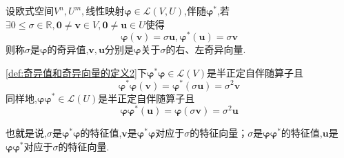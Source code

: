 \begin{formal}
    \begin{definition}[奇异值和奇异向量的定义]\label{def:奇异值和奇异向量的定义2}
        设欧式空间$V^n,U^m,$线性映射$\bm{\varphi}\in\mathcal{L}\left(V,U\right)$,伴随$\bm{\varphi}^*$,若$\exists0\leqslant\sigma\in\mathbb{R},\bm{0}\neq\bm{v}\in V,\bm{0}\neq\bm{u}\in U$使得\[
        \bm{\varphi}\left(\bm{v}\right)=\sigma\bm{u},\bm{\varphi}^*\left(\bm{u}\right)=\sigma\bm{v}
        \]则称$\sigma$是$\bm{\varphi}$的奇异值,$\bm{v},\bm{u}$分别是$\bm{\varphi}$关于$\sigma$的右、左奇异向量.
    \end{definition}
\end{formal}

\begin{red}
    \begin{remark}
        \cref{def:奇异值和奇异向量的定义2}下$\bm{\varphi}^*\bm{\varphi}\in\mathcal{L}\left(V\right)$是半正定自伴随算子且\[
        \bm{\varphi}^*\bm{\varphi}\left(\bm{v}\right)=\bm{\varphi}^*\left(
            \sigma\bm{u}
        \right)=\sigma^2\bm{v}
        \]同样地,$\bm{\varphi\varphi}^*\in\mathcal{L}\left(U\right)$是半正定自伴随算子且\[
        \bm{\varphi\varphi}^*\left(\bm{u}\right)=\bm{\varphi}\left(
            \sigma\bm{v}
        \right)=\sigma^2\bm{u}
        \] 

        也就是说,$\sigma$是$\bm{\varphi}^*\bm{\varphi}$的特征值,$\bm{v}$是$\bm{\varphi}^*\bm{\varphi}$对应于$\sigma$的特征向量；$\sigma$是$\bm{\varphi\varphi}^*$的特征值,$\bm{u}$是$\bm{\varphi\varphi}^*$对应于$\sigma$的特征向量.
    \end{remark}
\end{red}

